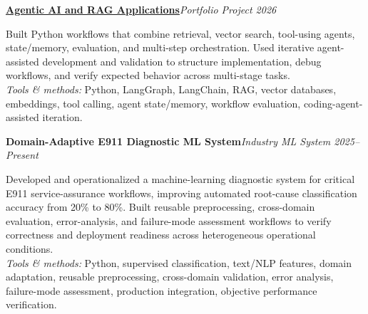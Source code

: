 \documentclass[10pt,letterpaper]{extarticle}
\newcommand{\project}[3]{\Needspace{3\baselineskip}\textbf{#1}\hfill\textit{#2 \textbar{} #3}\par}
\begin{document}
\project{\href{https://github.com/WaseemRaza844/agentic-ai-projects-by-was}{Agentic AI and RAG Applications}}{Portfolio Project}{2026}
Built Python workflows that combine retrieval, vector search, tool-using agents, state/memory, evaluation, and multi-step orchestration. Used iterative agent-assisted development and validation to structure implementation, debug workflows, and verify expected behavior across multi-stage tasks.\\[-1pt]
{\small\textit{Tools \& methods:} Python, LangGraph, LangChain, RAG, vector databases, embeddings, tool calling, agent state/memory, workflow evaluation, coding-agent-assisted iteration.}

\project{Domain-Adaptive E911 Diagnostic ML System}{Industry ML System}{2025--Present}
Developed and operationalized a machine-learning diagnostic system for critical E911 service-assurance workflows, improving automated root-cause classification accuracy from 20\% to 80\%. Built reusable preprocessing, cross-domain evaluation, error-analysis, and failure-mode assessment workflows to verify correctness and deployment readiness across heterogeneous operational conditions.\\[-1pt]
{\small\textit{Tools \& methods:} Python, supervised classification, text/NLP features, domain adaptation, reusable preprocessing, cross-domain validation, error analysis, failure-mode assessment, production integration, objective performance verification.}
\end{document}
